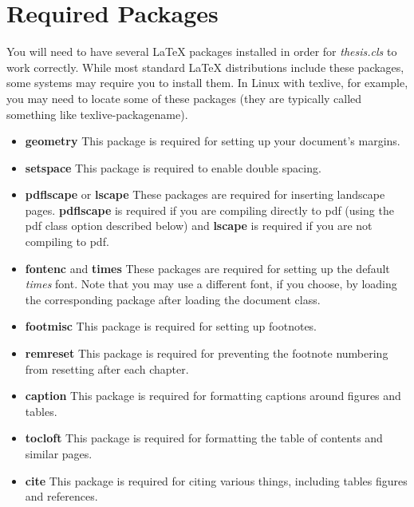 \documentclass[master]{thesis}
\begin{document}
\section{Required Packages}

You will need to have several \LaTeX{} packages installed in order for \textit{thesis.cls} to work correctly.  While most standard \LaTeX{} distributions include these packages, some systems may require you to install them.  In Linux with texlive, for example, you may need to locate some of these packages (they are typically called something like texlive-packagename).

\begin{itemize}
    \item \textbf{geometry}  This package is required for setting up your document's margins.

    \item \textbf{setspace}  This package is required to enable double spacing.

    \item \textbf{pdflscape}  or \textbf{lscape}  These packages are required for inserting landscape pages.  \textbf{pdflscape} is required if you are compiling directly to pdf (using the pdf class option described below) and \textbf{lscape} is required if you are not compiling to pdf.

    \item \textbf{fontenc} and \textbf{times}  These packages are required for setting up the default \textit{times} font.  Note that you may use a different font, if you choose, by loading the corresponding package after loading the document class.

    \item \textbf{footmisc}  This package is required for setting up footnotes.

    \item \textbf{remreset}  This package is required for preventing the footnote numbering from resetting after each chapter.

    \item \textbf{caption}  This package is required for formatting captions around figures and tables.

    \item \textbf{tocloft}  This package is required for formatting the table of contents and similar pages.

    \item \textbf{cite}  This package is required for citing various things, including tables figures and references.
\end{itemize}
\end{document}
